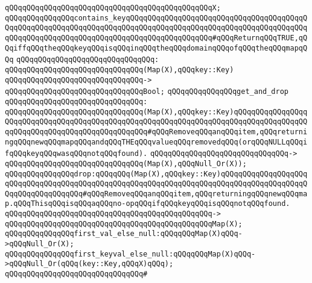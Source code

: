 \verb|qQQqqQQqqQQqqQQqqQQqqQQqqQQqqQQqqQQqqQQqqQQqqQQqX;|\newline
\newline
\verb|qQQqqQQqqQQqqQQqcontains_keyqQQqqQQqqQQqqQQqqQQqqQQqqQQqqQQqqQQqqQQqqQQqqQQqqQQqqQQqqQQqqQQqqQQqqQQqqQQqqQQqqQQqqQQqqQQqqQQqqQQqqQQqqQQqqQQqqQQqqQQqqQQqqQQqqQQqqQQqqQQqqQQqqQQqqQQqqQQqqQQq#qQQqReturnqQQqTRUE,qQQqiffqQQqtheqQQqkeyqQQqisqQQqinqQQqtheqQQqdomainqQQqofqQQqtheqQQqmapqQQq|\newline
\verb|qQQqqQQqqQQqqQQqqQQqqQQqqQQqqQQq:|\newline
\verb|qQQqqQQqqQQqqQQqqQQqqQQqqQQqqQQq(Map(X),qQQqkey::Key)|\newline
\verb|qQQqqQQqqQQqqQQqqQQqqQQqqQQqqQQq->|\newline
\verb|qQQqqQQqqQQqqQQqqQQqqQQqqQQqqQQqBool;|\newline
\newline
\verb|qQQqqQQqqQQqqQQqget_and_drop|\newline
\verb|qQQqqQQqqQQqqQQqqQQqqQQqqQQqqQQq:|\newline
\verb|qQQqqQQqqQQqqQQqqQQqqQQqqQQqqQQq(Map(X),qQQqkey::Key)qQQqqQQqqQQqqQQqqQQqqQQqqQQqqQQqqQQqqQQqqQQqqQQqqQQqqQQqqQQqqQQqqQQqqQQqqQQqqQQqqQQqqQQqqQQqqQQqqQQqqQQqqQQqqQQqqQQqqQQq#qQQqRemoveqQQqanqQQqitem,qQQqreturningqQQqnewqQQqmapqQQqandqQQqTHEqQQqvalueqQQqremovedqQQq(orqQQqNULLqQQqifqQQqkeyqQQqwasqQQqnotqQQqfound).|\newline
\verb|qQQqqQQqqQQqqQQqqQQqqQQqqQQqqQQq->|\newline
\verb|qQQqqQQqqQQqqQQqqQQqqQQqqQQqqQQq(Map(X),qQQqNull_Or(X));|\newline
\newline
\verb|qQQqqQQqqQQqqQQqdrop:qQQqqQQq(Map(X),qQQqkey::Key)qQQqqQQqqQQqqQQqqQQqqQQqqQQqqQQqqQQqqQQqqQQqqQQqqQQqqQQqqQQqqQQqqQQqqQQqqQQqqQQqqQQqqQQqqQQqqQQqqQQqqQQqqQQq#qQQqRemoveqQQqanqQQqitem,qQQqreturningqQQqnewqQQqmap.qQQqThisqQQqisqQQqaqQQqno-opqQQqifqQQqkeyqQQqisqQQqnotqQQqfound.|\newline
\verb|qQQqqQQqqQQqqQQqqQQqqQQqqQQqqQQqqQQqqQQqqQQqqQQq->|\newline
\verb|qQQqqQQqqQQqqQQqqQQqqQQqqQQqqQQqqQQqqQQqqQQqqQQqMap(X);|\newline
\newline
\verb|qQQqqQQqqQQqqQQqfirst_val_else_null:qQQqqQQqMap(X)qQQq->qQQqNull_Or(X);|\newline
\verb|qQQqqQQqqQQqqQQqfirst_keyval_else_null:qQQqqQQqMap(X)qQQq->qQQqNull_Or(qQQq(key::Key,qQQqX)qQQq);|\newline
\verb|qQQqqQQqqQQqqQQqqQQqqQQqqQQqqQQq#|\newline
